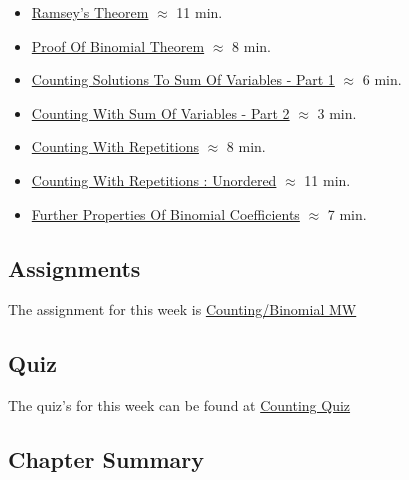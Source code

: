 \begin{itemize}
    \item \href{https://applied.cs.colorado.edu/mod/hvp/view.php?id=51805}{Ramsey's Theorem} $\approx$ 11 min.
    \item \href{https://applied.cs.colorado.edu/mod/hvp/view.php?id=51806}{Proof Of Binomial Theorem} $\approx$ 8 min.
    \item \href{https://applied.cs.colorado.edu/mod/hvp/view.php?id=51807}{Counting Solutions To Sum Of Variables - Part 1} $\approx$ 6 min.
    \item \href{https://applied.cs.colorado.edu/mod/hvp/view.php?id=51808}{Counting With Sum Of Variables - Part 2} $\approx$ 3 min.
    \item \href{https://applied.cs.colorado.edu/mod/hvp/view.php?id=51809}{Counting With Repetitions} $\approx$ 8 min.
    \item \href{https://applied.cs.colorado.edu/mod/hvp/view.php?id=51810}{Counting With Repetitions : Unordered} $\approx$ 11 min.
    \item \href{https://applied.cs.colorado.edu/mod/hvp/view.php?id=51811}{Further Properties Of Binomial Coefficients} $\approx$ 7 min.
\end{itemize}



\subsection{Assignments}

The assignment for this week is \href{https://applied.cs.colorado.edu/mod/quiz/view.php?id=51814}{Counting/Binomial MW}  

\subsection{Quiz}

The quiz's for this week can be found at \href{https://applied.cs.colorado.edu/mod/quiz/view.php?id=51813}{Counting Quiz}  

\subsection{Chapter Summary}


